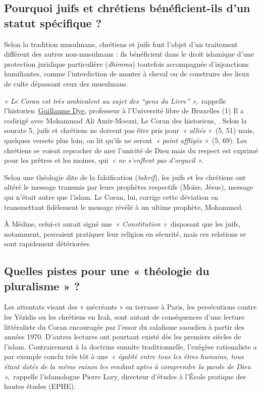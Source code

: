 \subsection{ Pourquoi juifs et chrétiens bénéficient-ils d'un statut
spécifique ?}

Selon la tradition musulmane, chrétiens et juifs font l'objet d'un
traitement différent des autres non-musulmans : ils bénéficient dans le
droit islamique d'une protection juridique particulière (\emph{dhimma})
toutefois accompagnée d'injonctions humiliantes, comme l'interdiction de
monter à cheval ou de construire des lieux de culte dépassant ceux des
musulmans.
 

\emph{« Le Coran est très ambivalent au sujet des ``gens du Livre''
»,~}rappelle
l'historien~\href{https://www.la-croix.com/Culture/Livres-et-idees/historiens-decryptent-Coran-avant-lislam-2019-11-27-1201063090}{\underline{Guillaume
Dye}}, professeur à l'Université libre de Bruxelles (1) Il a codirigé avec Mohammad Ali Amir-Moezzi, Le Coran des
historiens,  . Selon la
sourate 5, juifs et chrétiens ne doivent pas être pris pour~\emph{«
alliés »~}(5, 51) mais, quelques versets plus loin, on lit qu'ils ne
seront~\emph{« point affligés »~}(5, 69). Les chrétiens se voient
reprocher de nier l'unicité de Dieu mais du respect est exprimé pour les
prêtres et les moines, qui~\emph{« ne s'enflent pas d'orgueil ».}

\begin{Def}[tahrif]
Selon une théologie dite de la falsification (\emph{tahrif}), les juifs
et les chrétiens ont altéré le message transmis par leurs prophètes
respectifs (Moïse, Jésus), message qui n'était autre que l'islam. Le
Coran, lui, corrige cette déviation en transmettant fidèlement le
message révélé à un ultime prophète, Mohammed.
\end{Def}
 À Médine, celui-ci aurait
signé une~\emph{« Constitution »~}disposant que les juifs, notamment,
pouvaient pratiquer leur religion en sécurité, mais ces relations se
sont rapidement détériorées.

\subsection{Quelles pistes pour une « théologie du pluralisme » ?}

Les attentats visant des « mécréants » en terrasse à Paris, les
persécutions contre les Yézidis ou les chrétiens en Irak, sont autant de
conséquences d'une lecture littéraliste du Coran encouragée par l'essor
du salafisme saoudien à partir des années 1970. D'autres lectures ont
pourtant existé dès les premiers siècles de l'islam. Contrairement à la
doctrine sunnite traditionnelle, l'exégèse rationaliste a par exemple
conclu très tôt à une~\emph{« égalité entre tous les êtres humains, tous
étant dotés de la même raison les rendant aptes à comprendre la parole
de Dieu »,~}rappelle l'islamologue Pierre Lory, directeur d'études à
l'École pratique des hautes études (EPHE).

